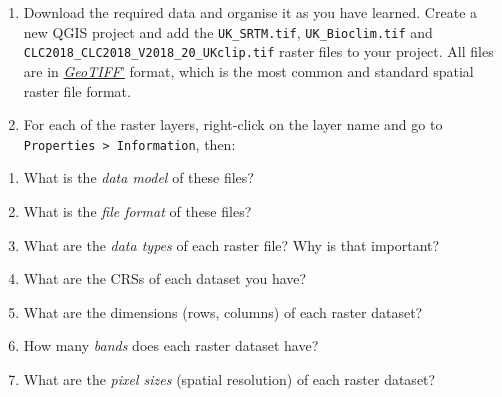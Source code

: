 \documentclass[
  letterpaper,
  DIV=11,
  numbers=noendperiod]{scrreprt}
\begin{document}
\begin{enumerate}
\def\labelenumi{(\arabic{enumi})}
\setcounter{enumi}{117}
\item
  Download the required data and organise it as you have learned. Create
  a new QGIS project and add the \texttt{UK\_SRTM.tif},
  \texttt{UK\_Bioclim.tif} and
  \texttt{CLC2018\_CLC2018\_V2018\_20\_UKclip.tif} raster files to your
  project. All files are in
  \href{https://en.wikipedia.org/wiki/GeoTIFF}{\emph{GeoTIFF}'} format,
  which is the most common and standard spatial raster file format.
\item
  For each of the raster layers, right-click on the layer name and go to
  \texttt{Properties\ \textgreater{}\ Information}, then:
\end{enumerate}

\begin{tcolorbox}[enhanced jigsaw, coltitle=black, toprule=.15mm, breakable, opacitybacktitle=0.6, left=2mm, colback=white, leftrule=.75mm, rightrule=.15mm, colbacktitle=quarto-callout-important-color!10!white, toptitle=1mm, titlerule=0mm, colframe=quarto-callout-important-color-frame, arc=.35mm, bottomtitle=1mm, opacityback=0, bottomrule=.15mm, title=\textcolor{quarto-callout-important-color}{\faExclamation}\hspace{0.5em}{Stop and Think}]

\begin{enumerate}
\def\labelenumi{\alph{enumi})}
\item
  What is the \emph{data model} of these files?
\item
  What is the \emph{file format} of these files?
\item
  What are the \emph{data types} of each raster file? Why is that
  important?
\item
  What are the CRSs of each dataset you have?
\item
  What are the dimensions (rows, columns) of each raster dataset?
\item
  How many \emph{bands} does each raster dataset have?
\item
  What are the \emph{pixel sizes} (spatial resolution) of each raster
  dataset?
\end{enumerate}

\end{tcolorbox}
\end{document}
